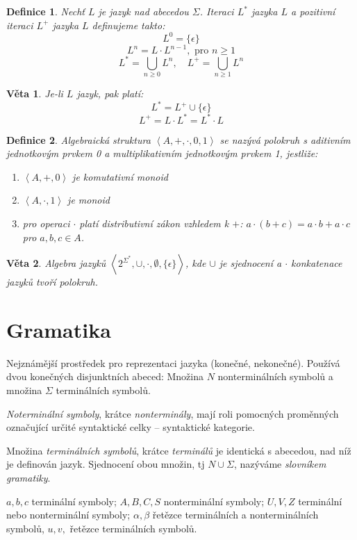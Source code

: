 \documentclass[a4paper, 11pt]{report}
\newtheorem{mydef}{Definice}[chapter]
\newtheorem{veta}{Věta}[chapter]
\begin{document}
\begin{mydef}
Nechť $L$ je jazyk nad abecedou $\Sigma$. \emph{Iteraci} $L^*$ jazyka $L$ a \emph{pozitivní iteraci} $L^+$ jazyka $L$ definujeme takto:
$$L^0 = \{\epsilon\}$$
$$L^n = L \cdot L^{n-1}, \text{ pro } n \geq 1$$
$$L^* = \bigcup\limits_{n \geq 0} L^n, \quad L^+ = \bigcup\limits_{n \geq 1} L^n$$
\end{mydef}

\begin{veta}
Je-li $L$ jazyk, pak platí:
$$L^* = L^+ \cup \{\epsilon\}$$
$$L^+ = L \cdot L^* = L^* \cdot L$$
\end{veta}

\begin{mydef}
Algebraická struktura $\left< A, +, \cdot, 0, 1 \right>$ se nazývá polokruh s aditivním jednotkovým prvkem 0 a multiplikativním jednotkovým prvkem 1, jestliže:
\begin{enumerate}[(1)]
	\item $\left< A, +, 0 \right>$ je komutativní monoid
	\item $\left< A, \cdot, 1 \right>$ je monoid
	\item pro operaci $\cdot$ platí distributivní zákon vzhledem k $+$:
	$ a \cdot (b + c) = a \cdot b + a \cdot c$ pro $a, b, c \in A$.
\end{enumerate}
\end{mydef}

\begin{veta}
Algebra jazyků $\left< 2^{\Sigma^*}, \cup, \cdot, \emptyset, \{\epsilon\} \right>$, kde $\cup$ je sjednocení a $\cdot$ konkatenace jazyků tvoří polokruh.
\end{veta}

\section{Gramatika}
Nejznámější prostředek pro reprezentaci jazyka (konečné, nekonečné). Používá dvou konečných disjunktních abeced: Množina $N$ nonterminálních symbolů a množina $\Sigma$ terminálních symbolů.

\emph{Noterminální symboly}, krátce \emph{nonterminály}, mají roli pomocných proměnných označující určité syntaktické celky -- syntaktické kategorie.

Množina \emph{terminálních symbolů}, krátce \emph{terminálů} je identická s abecedou, nad níž je definován jazyk. Sjednocení obou množin, tj $N \cup \Sigma$, nazýváme \emph{slovníkem gramatiky}.

$a, b, c$ terminální symboly; $A, B, C, S$ nonterminální symboly; $U, V, Z$ terminální nebo nonterminální symboly; $\alpha, \beta$ řetězce terminálních a nonterminálních symbolů, $u,v,$ řetězce terminálních symbolů.
\end{document}
